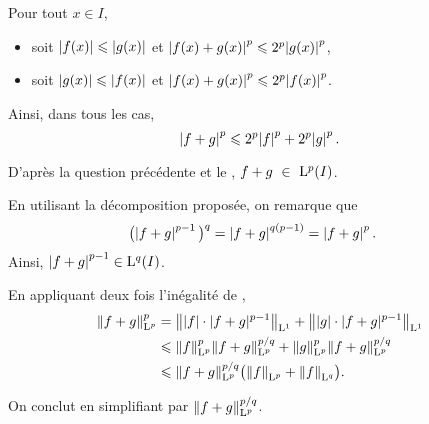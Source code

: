 \begin{solution}
\begin{reponses}
\item Pour tout $x \in I$,
\begin{itemize}
\item soit $\mathopen{}\left| f(x) \right| \leqslant \mathopen{}\left| g(x) \right|$ et $\mathopen{}\left| f(x) + g(x) \right|^p \leqslant 2^p \mathopen{}\left| g(x) \right|^p$,
\item soit $\mathopen{}\left| g(x) \right| \leqslant \mathopen{}\left| f(x) \right|$ et $\mathopen{}\left| f(x) + g(x) \right|^p \leqslant 2^p \mathopen{}\left| f(x) \right|^p$.
\end{itemize}
Ainsi, dans tous les cas,
\[
\mathopen{}\left| f + g \right|^p \leqslant 2^p \mathopen{}\left| f \right|^p + 2^p \mathopen{}\left| g \right|^p.
\]

\item D'après la question précédente et le , $f + g~\in~\mathrm{L}^p(I)$.

\item En utilisant la décomposition proposée, on remarque que
\begin{align*}
\big(\mathopen{}\mathopen{}\left| f + g \right|^{p-1}\big)^q
&= \mathopen{}\left| f + g \right|^{q(p-1)}
= \mathopen{}\left| f + g \right|^p.
\end{align*}
Ainsi, $\mathopen{}\left| f + g \right|^{p-1} \in \mathrm{L}^q(I)$.

En appliquant deux fois l'inégalité de ,
\begin{align*}
\norm{f + g}_{\mathrm{L}^p}^p
&= \norm{|f| \cdot |f + g|^{p-1}}_{\mathrm{L}^1}
+ \norm{|g| \cdot |f + g|^{p-1}}_{\mathrm{L}^1}\\
&\leqslant \norm{f}_{\mathrm{L}^p}^p \norm{f + g}_{\mathrm{L}^p}^{p/q}
+ \norm{g}_{\mathrm{L}^p}^p \norm{f + g}_{\mathrm{L}^p}^{p/q}\\
&\leqslant \norm{f + g}_{\mathrm{L}^p}^{p/q} \big(\norm{f}_{\mathrm{L}^p} + \norm{f}_{\mathrm{L}^q}\big).
\end{align*}

On conclut en simplifiant par $\norm{f + g}_{\mathrm{L}^p}^{p/q}$.
\end{reponses}
\end{solution}


